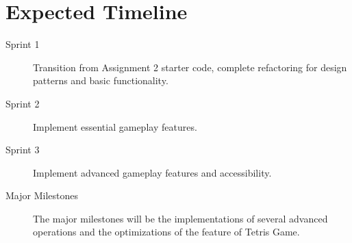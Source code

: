\documentclass{article}
\begin{document}
\clearpage

\section{Expected Timeline}

\begin{description}
\item[Sprint 1] Transition from Assignment 2 starter code, complete refactoring for design patterns and basic functionality.
\item[Sprint 2] Implement essential gameplay features.
\item[Sprint 3] Implement advanced gameplay features and accessibility.
\item[Major Milestones] The major milestones will be the implementations of several advanced operations and the optimizations of the feature of Tetris Game.
\end{description}

\begin{figure}[H]
    
\end{figure}
\end{document}
